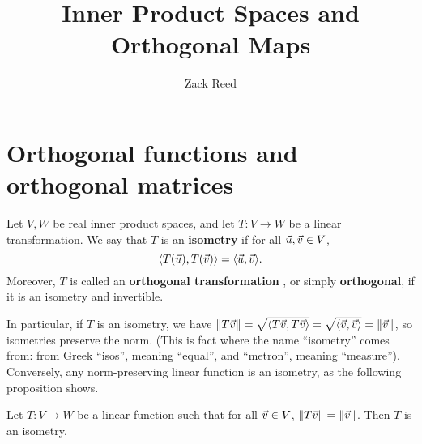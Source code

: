 \documentclass{ximera}
\author{Zack Reed}
\title{Inner Product Spaces and Orthogonal Maps}
\begin{document}
\begin{abstract}


\end{abstract}
\maketitle



\section{Orthogonal functions and orthogonal matrices}


\begin{definition}\label{def:isometry-orthogonal-map}
  Let $V,W$ be real inner product spaces, and let $T:V\to W$ be a
  linear transformation. We say that $T$ is an \textbf{isometry}%
   if for all
  $\vec{u},\vec{v}\in V$,
  \begin{equation*}
    \langle T(\vec{u}),T(\vec{v}) \rangle = \langle \vec{u},\vec{v} \rangle.
  \end{equation*}
  Moreover, $T$ is called an \textbf{orthogonal transformation}%
  , or simply
  \textbf{orthogonal}, if it is an isometry and invertible.
\end{definition}

In particular, if $T$ is an isometry, we have
$\left\|T\vec{v}\right\| = \sqrt{\langle T\vec{v},T\vec{v} \rangle} =
\sqrt{\langle \vec{v},\vec{v} \rangle} = \left\|\vec{v}\right\|$, so isometries
preserve the norm. (This is fact where the name ``isometry'' comes
from: from Greek ``isos'', meaning ``equal'', and ``metron'', meaning
``measure''). Conversely, any norm-preserving linear function is an
isometry, as the following proposition shows.

\begin{proposition}\label{prop:norm-isometry}
  Let $T:V\to W$ be a linear function such that for all
  $\vec{v}\in V$, $\left\|T\vec{v}\right\| = \left\|\vec{v}\right\|$. Then $T$ is
  an isometry.
\end{proposition}
\end{document}
